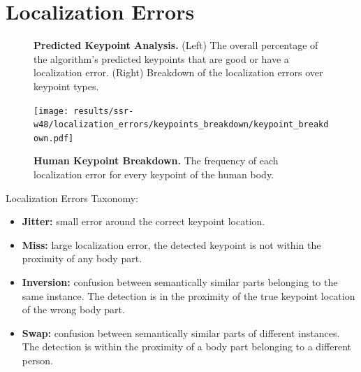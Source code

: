 \documentclass[10pt,onecolumn,letterpaper]{article}
\begin{document}
\clearpage

\section{Localization Errors}

\begin{figure}[h!]
\centering
{}
\caption{ {\small \textbf{Predicted Keypoint Analysis.}
(Left) The overall percentage of the algorithm's predicted keypoints that are good or have a localization error.
(Right) Breakdown of the localization errors over keypoint types.}}
\end{figure}

\begin{figure}
\texttt{[image: results/ssr-w48/localization\_errors/keypoints\_breakdown/keypoint\_breakdown.pdf]}
\caption{ {\small \textbf{Human Keypoint Breakdown.} The frequency of each localization error for every keypoint of the human body.}}
\end{figure}

Localization Errors Taxonomy:
\begin{itemize}
\item \textbf{Jitter:} small error around the correct keypoint location.

\item \textbf{Miss:} large localization error, the detected keypoint is not within the proximity of any body part.

\item \textbf{Inversion:} confusion between semantically similar parts belonging to the same instance. The detection is in the proximity of the true keypoint location of the wrong body part.

\item \textbf{Swap:} confusion between semantically similar parts of different instances. The detection is within the proximity of a body part belonging to a different person.

\end{itemize}
\end{document}
